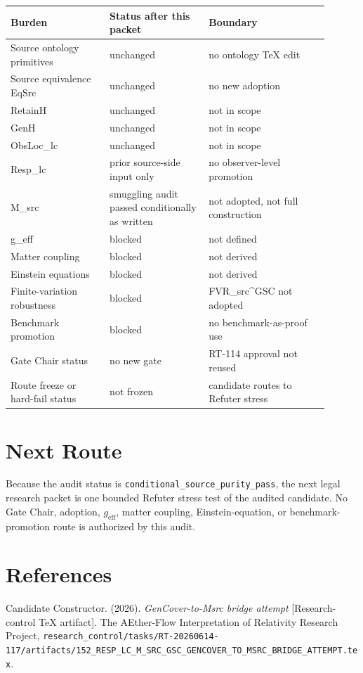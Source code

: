 \documentclass[11pt]{article}
\begin{document}
\begin{longtable}{|p{0.28\linewidth}|p{0.28\linewidth}|p{0.34\linewidth}|}
\hline
\textbf{Burden} & \textbf{Status after this packet} & \textbf{Boundary} \\
\hline
Source ontology primitives & unchanged & no ontology TeX edit \\
\hline
Source equivalence EqSrc & unchanged & no new adoption \\
\hline
RetainH & unchanged & not in scope \\
\hline
GenH & unchanged & not in scope \\
\hline
ObsLoc_lc & unchanged & not in scope \\
\hline
Resp_lc & prior source-side input only & no observer-level promotion \\
\hline
M_src & smuggling audit passed conditionally as written & not adopted, not full construction \\
\hline
g_eff & blocked & not defined \\
\hline
Matter coupling & blocked & not derived \\
\hline
Einstein equations & blocked & not derived \\
\hline
Finite-variation robustness & blocked & FVR_src^GSC not adopted \\
\hline
Benchmark promotion & blocked & no benchmark-as-proof use \\
\hline
Gate Chair status & no new gate & RT-114 approval not reused \\
\hline
Route freeze or hard-fail status & not frozen & candidate routes to Refuter stress \\
\hline
\end{longtable}

\section{Next Route}

Because the audit status is \texttt{conditional\_source\_purity\_pass}, the
next legal research packet is one bounded Refuter stress test of the audited
candidate. No Gate Chair, adoption, \(g_{\mathrm{eff}}\), matter coupling,
Einstein-equation, or benchmark-promotion route is authorized by this audit.

\section*{References}

Candidate Constructor. (2026). \textit{GenCover-to-Msrc bridge attempt}
[Research-control TeX artifact]. The AEther-Flow Interpretation of Relativity
Research Project,
\texttt{research\_control/tasks/RT-20260614-117/artifacts/152\_RESP\_LC\_M\_SRC\_GSC\_GENCOVER\_TO\_MSRC\_BRIDGE\_ATTEMPT.tex}.
\end{document}
